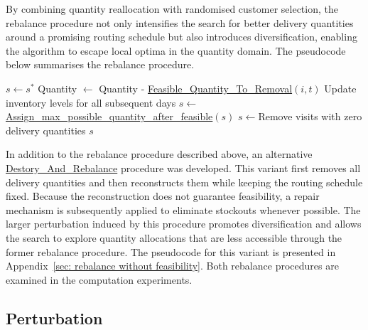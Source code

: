 \documentclass{article}
\begin{document}
By combining quantity reallocation with randomised customer selection, the rebalance procedure not only intensifies the search for better delivery quantities around a promising routing schedule but also introduces diversification, enabling the algorithm to escape local optima in the quantity domain. The pseudocode below summarises the rebalance procedure.

\begin{algorithm}[H]
\caption{\textbf{Rebalance$(s^*)$}}\label{alg:rebalance}
\begin{algorithmic}[1]
\STATE $s \gets s^*$
            \STATE Quantity $\gets $ Quantity - \hyperref[alg:FeasibleQuantityRemoval]{Feasible\_Quantity\_To\_Removal}$(i, t)$
            \STATE Update inventory levels for all subsequent days
        \ENDIF
    \ENDFOR
\ENDFOR
\STATE $s\gets$\hyperref[alg:AssignQuantity]{Assign\_max\_possible\_quantity\_after\_feasible}$(s)$
\STATE $s\gets$Remove visits with zero delivery quantities
\RETURN $s$
\end{algorithmic}
\end{algorithm}




In addition to the rebalance procedure described above, an alternative \hyperref[alg: destroy and rebalance]{Destory\_And\_Rebalance} procedure was developed. This variant first removes all delivery quantities and then reconstructs them while keeping the routing schedule fixed. Because the reconstruction does not guarantee feasibility, a repair mechanism is subsequently applied to eliminate stockouts whenever possible. The larger perturbation induced by this procedure promotes diversification and allows the search to explore quantity allocations that are less accessible through the former rebalance procedure. The pseudocode for this variant is presented in Appendix~\ref{sec: rebalance without feasibility}. Both rebalance procedures are examined in the computation experiments.


\subsection{Perturbation} \label{sec:perturbation}
\end{document}
